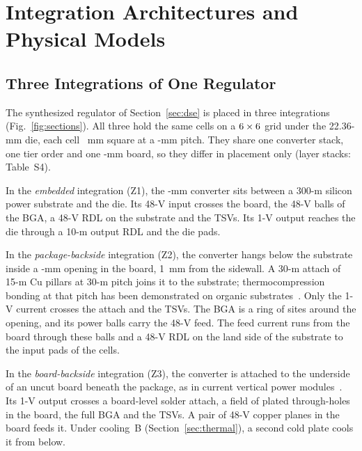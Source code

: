 \section{Integration Architectures and Physical Models}\label{sec:models}

\subsection{Three Integrations of One Regulator}\label{sec:archs}
The synthesized regulator of Section~\ref{sec:dse} is placed in three integrations
(Fig.~\ref{fig:sections}). All three hold the same \FrDseOptM{} cells on a
$6\times6$ grid under the 22.36-mm die, each cell \FrConvCellSide~mm square at a
\MthCellPitch-mm pitch. They share one converter stack, one tier order and one
\FrBoardMm-mm board, so they differ in placement only (layer stacks: Table~S4).

In the \emph{embedded} integration (Z1), the \FrDseOptStack-mm converter sits between a
300-\textmu m silicon power substrate and the die. Its 48-V input crosses the board, the 48-V
balls of the BGA, a 48-V RDL on the substrate and the TSVs. Its 1-V output reaches the die through a 10-\textmu m output RDL
and the die pads.

In the \emph{package-backside} integration (Z2), the converter hangs below the substrate inside
a \MthCutout-mm opening in the board, 1~mm from the sidewall. A 30-\textmu m attach of
15-\textmu m Cu pillars at 30-\textmu m pitch joins it to the substrate; thermocompression
bonding at that pitch has been demonstrated on organic substrates~\cite{Au2016CuPillar30um}.
Only the 1-V current crosses the attach and the TSVs. The BGA is a ring of \MthSitesRing{}
sites around the opening, and its power balls carry the 48-V feed. The feed current runs from
the board through these balls and a 48-V RDL on the land side of the substrate to the input pads
of the cells.

In the \emph{board-backside} integration (Z3), the converter is attached to the underside of an
uncut board beneath the package, as in current vertical power modules~\cite{Vicor_VPD_AI}. Its
1-V output crosses a board-level solder attach, a field of plated through-holes in the board,
the full BGA and the TSVs. A pair of 48-V copper planes in the board feeds it. Under cooling~B
(Section~\ref{sec:thermal}), a second cold plate cools it from below.

